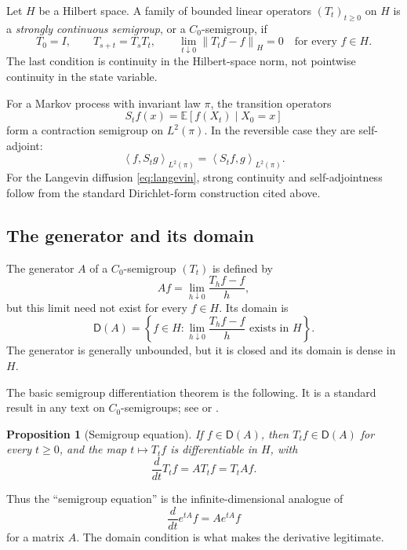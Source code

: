 \documentclass[11pt]{article}
\newtheorem{proposition}[theorem]{Proposition}
\newcommand{\E}{\mathbb E}
\newcommand{\ip}[2]{\left\langle #1,#2\right\rangle}
\newcommand{\norm}[1]{\left\lVert #1\right\rVert}
\newcommand{\1}{\mathbf 1}
\newcommand{\D}{\mathsf D}
\begin{document}
Let \(H\) be a Hilbert space.  A family of bounded linear operators
\((T_t)_{t\geq0}\) on \(H\) is a \emph{strongly continuous semigroup}, or a
\(C_0\)-semigroup, if
\[
 T_0=I,\qquad T_{s+t}=T_sT_t,
 \qquad \lim_{t\downarrow0}\norm{T_tf-f}_H=0
 \quad\text{for every }f\in H.
\]
The last condition is continuity in the Hilbert-space norm, not pointwise
continuity in the state variable.

For a Markov process with invariant law \(\pi\), the transition operators
\[
 S_tf(x)=\E[f(X_t)\mid X_0=x]
\]
form a contraction semigroup on \(L^2(\pi)\).  In the reversible case they
are self-adjoint:
\[
 \ip{f}{S_tg}_{L^2(\pi)}
 =\ip{S_tf}{g}_{L^2(\pi)}.
\]
For the Langevin diffusion \eqref{eq:langevin}, strong continuity and
self-adjointness follow from the standard Dirichlet-form construction cited
above.

\subsection{The generator and its domain}

The generator \(A\) of a \(C_0\)-semigroup \((T_t)\) is defined by
\[
 Af=\lim_{h\downarrow0}\frac{T_hf-f}{h},
\]
but this limit need not exist for every \(f\in H\).  Its domain is
\begin{equation}\label{eq:generator-domain}
 \D(A)=
 \left\{
 f\in H:
 \lim_{h\downarrow0}\frac{T_hf-f}{h}
 \text{ exists in }H
 \right\}.
\end{equation}
The generator is generally unbounded, but it is closed and its domain is
dense in \(H\).

The basic semigroup differentiation theorem is the following.  It is a
standard result in any text on \(C_0\)-semigroups; see
\citet[Chapter~1]{Pazy1983} or
\citet[Chapter~II]{EngelNagel2000}.

\begin{proposition}[Semigroup equation]\label{prop:semigroup-equation}
If \(f\in\D(A)\), then \(T_tf\in\D(A)\) for every \(t\geq0\), and the map
\(t\mapsto T_tf\) is differentiable in \(H\), with
\begin{equation}\label{eq:semigroup-equation}
 \frac{d}{dt}T_tf=AT_tf=T_tAf.
\end{equation}
\end{proposition}

Thus the ``semigroup equation'' is the infinite-dimensional analogue of
\[
 \frac{d}{dt}e^{tA}f=Ae^{tA}f
\]
for a matrix \(A\).  The domain condition is what makes the derivative
legitimate.
\end{document}

